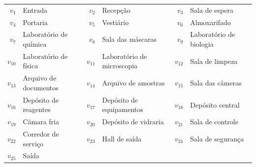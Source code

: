 \begin{tabular}{rl|rl|rl}
\toprule
$v_{1}$ & Entrada & $v_{2}$ & Recepção & $v_{3}$ & Sala de espera \\
$v_{4}$ & Portaria & $v_{5}$ & Vestiário & $v_{6}$ & Almoxarifado \\
$v_{7}$ & Laboratório de química & $v_{8}$ & Sala das máscaras & $v_{9}$ & Laboratório de biologia \\
$v_{10}$ & Laboratório de física & $v_{11}$ & Laboratório de microscopia & $v_{12}$ & Sala de limpeza \\
$v_{13}$ & Arquivo de documentos & $v_{14}$ & Arquivo de amostras & $v_{15}$ & Sala das câmeras \\
$v_{16}$ & Depósito de reagentes & $v_{17}$ & Depósito de equipamentos & $v_{18}$ & Depósito central \\
$v_{19}$ & Câmara fria & $v_{20}$ & Depósito de vidraria & $v_{21}$ & Sala de controle \\
$v_{22}$ & Corredor de serviço & $v_{23}$ & Hall de saída & $v_{24}$ & Sala de segurança \\
$v_{25}$ & Saída &  &  &  &  \\
\bottomrule
\end{tabular}
